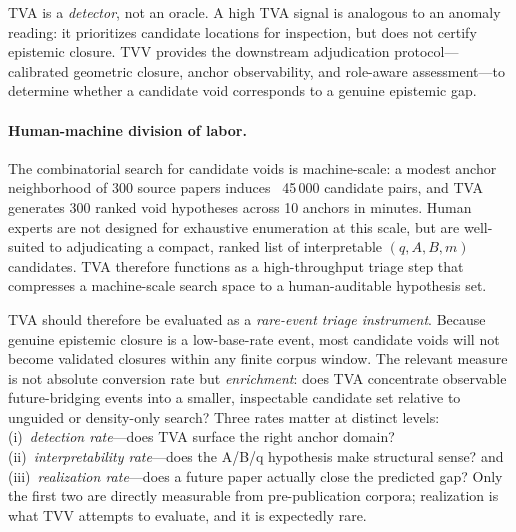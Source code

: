 \documentclass[11pt,twocolumn]{article}
\newcommand{\tva}{\textsf{TVA}}
\begin{document}
TVA is a \emph{detector}, not an oracle. A high TVA signal is analogous to an anomaly
reading: it prioritizes candidate locations for inspection, but does not certify
epistemic closure. TVV provides the downstream adjudication protocol---calibrated
geometric closure, anchor observability, and role-aware assessment---to determine
whether a candidate void corresponds to a genuine epistemic gap.

\paragraph{Human-machine division of labor.}
The combinatorial search for candidate voids is machine-scale: a modest anchor
neighborhood of 300 source papers induces ~45\,000 candidate pairs, and TVA
generates 300 ranked void hypotheses across 10 anchors in minutes. Human experts
are not designed for exhaustive enumeration at this scale, but are well-suited to
adjudicating a compact, ranked list of interpretable $(q,A,B,m)$ candidates.
TVA therefore functions as a high-throughput triage step that compresses a
machine-scale search space to a human-auditable hypothesis set.

\begin{table}[h!]
\centering\small
\caption{Division of labor.}
\end{table}

\tva{} should therefore be evaluated as a \emph{rare-event triage instrument}.
Because genuine epistemic closure is a low-base-rate event, most candidate voids will
not become validated closures within any finite corpus window. The relevant measure is
not absolute conversion rate but \emph{enrichment}: does TVA concentrate observable
future-bridging events into a smaller, inspectable candidate set relative to unguided
or density-only search? Three rates matter at distinct levels: (i)~\emph{detection
rate}---does TVA surface the right anchor domain? (ii)~\emph{interpretability rate}---does
the A/B/q hypothesis make structural sense? and (iii)~\emph{realization rate}---does
a future paper actually close the predicted gap? Only the first two are directly
measurable from pre-publication corpora; realization is what TVV attempts to
evaluate, and it is expectedly rare.
\end{document}
